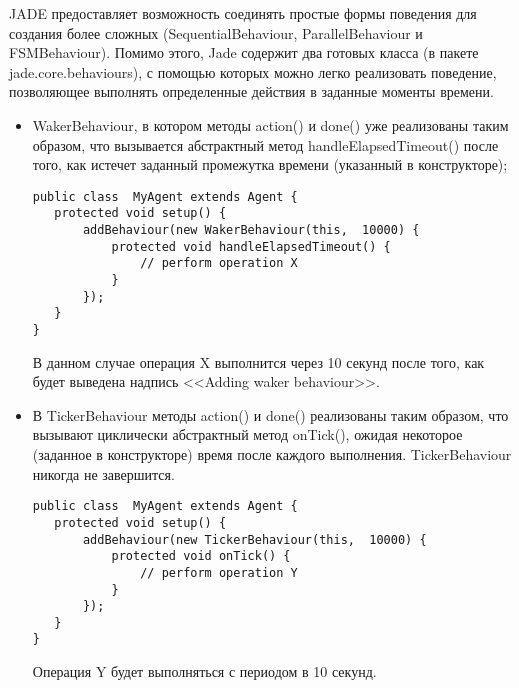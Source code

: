 JADE предоставляет возможность соединять простые формы поведения для создания более сложных (SequentialBehaviour, ParallelBehaviour и FSMBehaviour). Помимо этого, Jade содержит два готовых класса (в пакете jade.core.behaviours), с помощью которых можно легко реализовать поведение, позволяющее выполнять определенные действия в заданные моменты времени.
\begin{itemize}
\item WakerBehaviour, в котором методы action() и done() уже реализованы таким образом, что вызывается абстрактный метод handleElapsedTimeout() после того, как истечет заданный промежутка времени (указанный в конструкторе);
\begin{lstlisting}
public class  MyAgent extends Agent { 
   protected void setup() { 
       addBehaviour(new WakerBehaviour(this,  10000) { 
           protected void handleElapsedTimeout() { 
               // perform operation X 
           } 
       }); 
   } 
}
\end{lstlisting}
В данном случае операция X выполнится через 10 секунд после того, как будет выведена надпись <<Adding waker behaviour>>.
\item В TickerBehaviour методы action() и done() реализованы таким образом, что вызывают циклически абстрактный метод onTick(), ожидая некоторое (заданное в конструкторе) время после каждого выполнения. TickerBehaviour никогда не завершится. 
\begin{lstlisting}
public class  MyAgent extends Agent { 
   protected void setup() { 
       addBehaviour(new TickerBehaviour(this,  10000) { 
           protected void onTick() { 
               // perform operation Y 
           } 
       }); 
   } 
}
\end{lstlisting}
Операция Y будет выполняться с периодом в 10 секунд.
\end{itemize}

